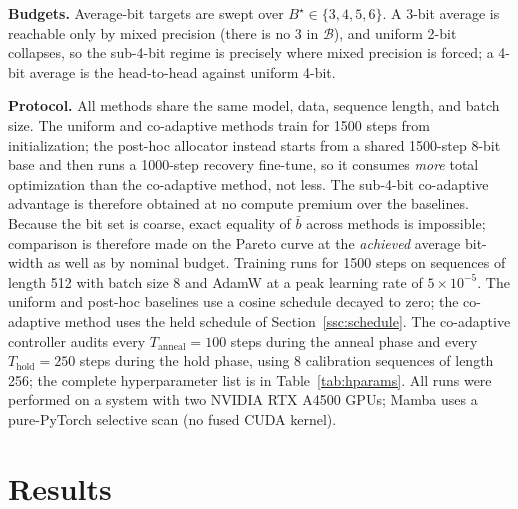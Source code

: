 \documentclass[conference]{IEEEtran}
\begin{document}
\noindent\textbf{Budgets.} Average-bit targets are swept over \(B^\star \in
\{3,4,5,6\}\). A 3-bit average is reachable only by mixed precision (there is no
3 in \(\mathcal{B}\)), and uniform 2-bit collapses, so the sub-4-bit regime is
precisely where mixed precision is forced; a 4-bit average is the head-to-head
against uniform 4-bit.

\noindent\textbf{Protocol.} All methods share the same model, data, sequence
length, and batch size. The uniform and co-adaptive methods train for 1500 steps
from initialization; the post-hoc allocator instead starts from a shared 1500-step
8-bit base and then runs a 1000-step recovery fine-tune, so it consumes \emph{more}
total optimization than the co-adaptive method, not less. The sub-4-bit co-adaptive
advantage is therefore obtained at no compute premium over the baselines. Because
the bit set is coarse, exact equality of \(\bar{b}\) across
methods is impossible; comparison is therefore made on the Pareto curve at the
\emph{achieved} average bit-width as well as by nominal budget.
Training runs for 1500 steps on sequences of length 512 with batch size 8 and
AdamW at a peak learning rate of $5{\times}10^{-5}$. The uniform and post-hoc
baselines use a cosine schedule decayed to zero; the co-adaptive method uses the held
schedule of Section~\ref{ssc:schedule}. The co-adaptive controller audits every
$T_{\text{anneal}}=100$ steps during the anneal phase and every
$T_{\text{hold}}=250$ steps during the hold phase, using 8 calibration sequences of
length 256; the complete hyperparameter list is in Table~\ref{tab:hparams}. All
runs were performed on a system with two NVIDIA RTX A4500 GPUs;
Mamba uses a pure-PyTorch selective scan (no fused CUDA kernel).

\section{Results}
\label{sec:results}
\end{document}
